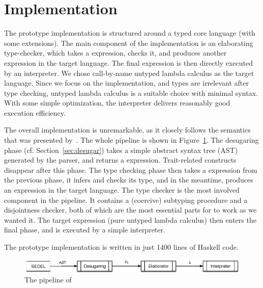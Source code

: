 \section{Implementation}

The \name prototype implementation is structured around a typed core language
(\bname with some extensions). The main component of the implementation is an
elaborating type-checker, which takes a \bname expression, checks it, and
produces another expression in the target language. The final expression is then
directly executed by an interpreter. We chose call-by-name untyped lambda
calculus as the target language. Since we focus on the implementation, and types
are irrelevant after type checking, untyped lambda calculus is a suitable choice
with minimal syntax. With some simple optimization, the interpreter delivers
reasonably good execution efficiency.

The overall implementation is unremarkable, as it closely follows the semantics
that was presented by~\citet{alpuimdisjoint}. The whole pipeline is shown in
Figure~\ref{fig:pipeline}. The desugaring phase (cf. Section~\ref{sec:desugar})
takes a simple abstract syntax tree (AST) generated by the parser, and returns a
\bname expression. Trait-related constructs disappear after this phase. The
type checking phase then takes a \bname expression from the previous phase, it
infers and checks its type, and in the meantime, produces an expression in the
target language. The type checker is the most involved component in the
pipeline. It contains a (coercive) subtyping procedure and a disjointness
checker, both of which are the most essential parts for \name to work as we
wanted it. The target expression (pure untyped lambda calculus) then enters the
final phase, and is executed by a simple interpreter.

The prototype implementation is written in just 1400 lines of Haskell code.

\begin{figure}
  \centering
  \includegraphics[scale=0.9]{pipeline.eps}
  \caption{The pipeline of \name}
  \label{fig:pipeline}
\end{figure}